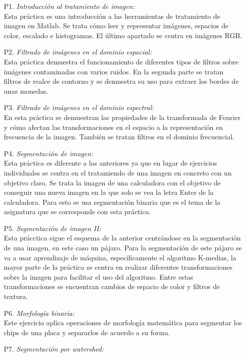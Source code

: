 \documentclass[a4paper,12pt]{report}
\begin{document}
\begin{itemize}
  \item [ P1.]\emph{Introducción al tratamiento de imagen:}\\
	Esta práctica es una introducción a las herramientas de tratamiento de imagen en Matlab. Se trata cómo leer y representar imágenes, espacios de color, escalado e histogramas. El último apartado se centra en imágenes RGB.
  \item [P2.]\emph{ Filtrado de imágenes en el dominio espacial:}\\
	Esta práctica demuestra el funcionamiento de diferentes tipos de filtros sobre imágenes contaminadas con varios ruidos. En la segunda parte se tratan filtros de realce de contorno y se demuestra su uso para extraer los bordes de unas monedas.
  \item [P3.]\emph{Filtrado de imágenes en el dominio espectral:}\\
	En esta práctica se demuestran las propiedades de la transformada de Fourier y cómo afectan las transformaciones en el espacio a la representación en frecuencia de la imagen. También se tratan filtros en el dominio frecuencial.
  \item [P4.]\emph{Segmentación de imagen:}\\
	Esta práctica es diferente a las anteriores ya que en lugar de ejercicios individuales se centra en el tratamiendo de una imagen en concreto con un objetivo claro. Se trata  la imagen de una calculadora con el objetivo de conseguir una nueva imagen en la que solo se vea la letra Enter de la calculadora. Para esto se usa segmentación binaria que es el tema de la asignatura que se corresponde con esta práctica.
  \item [P5.]\emph{Segmentación de imagen II:}\\
	Esta prácctica sigue el esquema de la anterior centrándose en la segmentación de una imagen, en este caso un pájaro. Para la segmentación de este pájaro se va a usar aprendizaje de máquina, específicamente el algoritmo K-medias, la mayor parte de la práctica se centra en realizar diferentes transformaciones sobre la imagen para facilitar el uso del algoritmo. Entre estas transformaciones se encuentran cambios de espacio de color y filtros de textura.
  \item [P6.]\emph{Morfología binaria:}\\
	Este ejercicio aplica operaciones de morfología matemática para segmentar los chips de una placa y separarlos de acuerdo a su forma.
  \item [P7.]\emph{Segmentación por watershed:}\\

\end{itemize}
\end{document}

